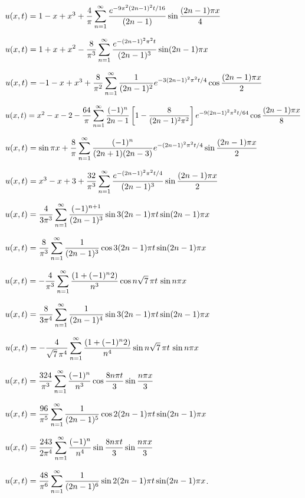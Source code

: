 $u(x,t)=1-x+x^3+\displaystyle\frac{4}{\pi}\sum_{n=1}^\infty\frac{e^{-9\pi^2(2n-1)^2t/16}}{(2n-1)}
\sin\frac{(2n-1)\pi x}{4}$


$u(x,t)=\displaystyle1+x+x^2
-\displaystyle\frac{8}{\pi^3}\sum_{n=1}^\infty
\frac{e^{-(2n-1)^2\pi^2t}}{(2n-1)^3}
\sin(2n-1)\pi x$

$u(x,t)=-1-x+x^3+
\displaystyle\frac{8}{\pi^2}\sum_{n=1}^\infty\frac{1}{(2n-1)^2}
e^{-3(2n-1)^2\pi^2t/4}
\cos\frac{(2n-1)\pi x}{2}$

$u(x,t)=x^2-x-2\displaystyle-\frac{64}{\pi}\sum_{n=1}^\infty\frac{(-1)^n}{2n-1}\left[
1-\frac{8}{(2n-1)^2\pi^2}\right]e^{-9(2n-1)^2\pi^2 t/64}\cos\frac{(2n-1)\pi
x}{8}$

$u(x,t)=\sin\pi x+\displaystyle{\frac{8}{\pi} \sum^\infty_{n=1}
\frac{(-1)^n}{(2n+1)(2n-3)} e^{-(2n-1)^2\pi^2 t/4}\sin\frac{(2n-1)\pi x}{2}}$

$u(x,t)=x^3-x+3+\displaystyle\frac{32}{\pi^3}\sum_{n=1}^\infty\frac{e^{-(2n-1)^2\pi^2t/4}}{(2n-1)^3}\sin\frac{(2n-1)\pi x}{2}$



$u(x,t)=\displaystyle\frac{4}{3\pi^3}\sum_{n=1}^\infty
\frac{(-1)^{n+1}}{(2n-1)^3}\sin3(2n-1)\pi t\sin(2n-1)\pi x$

$u(x,t)=\displaystyle\frac{8}{\pi^3}\sum_{n=1}^\infty\frac{1}{(2n-1)^3}
\cos3(2n-1)\pi t\sin(2n-1)\pi x$


$u(x,t)=\displaystyle-\frac{4}{\pi^3}\sum_{n=1}^\infty\frac{(1+(-1)^n2)}{n^3}
\cos n\sqrt7\,\pi t\,\sin n\pi x$

$u(x,t)=\displaystyle\frac{8}{3\pi^4}\sum_{n=1}^\infty\frac{1}{(2n-1)^4}
\sin3(2n-1)\pi t\sin(2n-1)\pi x$

$u(x,t)=\displaystyle-\frac{4}{\sqrt7\,\pi^4}\sum_{n=1}^\infty\frac{(1+(-1)^n2)}{n^4}
\sin n\sqrt7\,\pi t\,\sin n\pi x$

$u(x,t)=\displaystyle\frac{324}{\pi^3}\sum_{n=1}^\infty\frac{(-1)^n}{n^3}\cos\frac{8n\pi t}{3}\sin\frac{n\pi x}{3}$

$u(x,t)=\displaystyle\frac{96}{\pi^5}\sum_{n=1}^\infty\frac{1}{(2n-1)^5}
\cos2(2n-1)\pi t\sin(2n-1)\pi x$

$u(x,t)=\displaystyle\frac{243}{2\pi^4}\sum_{n=1}^\infty\frac{(-1)^n}{n^4}\sin\frac{8n\pi t}{3}\sin\frac{n\pi x}{3}$


$u(x,t)=\displaystyle\frac{48}{\pi^6}\sum_{n=1}^\infty\frac{1}{(2n-1)^6}
\sin2(2n-1)\pi t\sin(2n-1)\pi x$.





